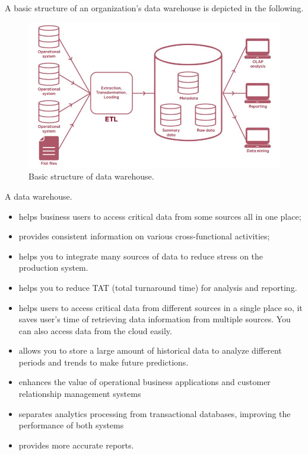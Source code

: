 \documentclass[
]{book}
\providecommand{\tightlist}{%
  \setlength{\itemsep}{0pt}\setlength{\parskip}{0pt}}
\begin{document}
A basic structure of an organization's data warehouse is depicted in the following.

\begin{figure}

{\centering \includegraphics[width=0.9\linewidth]{img01/w01-simpleDWStructure} 

}

\caption{Basic structure of data warehouse.}\label{fig:unnamed-chunk-9}
\end{figure}

A data warehouse.

\begin{itemize}
\tightlist
\item
  helps business users to access critical data from some sources all in one place;
\item
  provides consistent information on various cross-functional activities;
\item
  helps you to integrate many sources of data to reduce stress on the production system.
\item
  helps you to reduce TAT (total turnaround time) for analysis and reporting.
\item
  helps users to access critical data from different sources in a single place so, it saves user's time of retrieving data information from multiple sources. You can also access data from the cloud easily.
\item
  allows you to store a large amount of historical data to analyze different periods and trends to make future predictions.
\item
  enhances the value of operational business applications and customer relationship management systems
\item
  separates analytics processing from transactional databases, improving the performance of both systems
\item
  provides more accurate reports.
\end{itemize}
\end{document}
